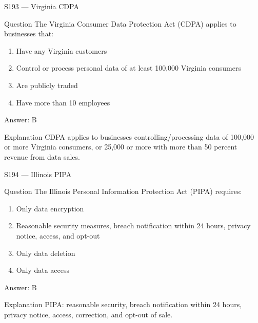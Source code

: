 \documentclass[aspectratio=169,8pt]{beamer}
\begin{document}
	\begin{frame}{S193 --- Virginia CDPA}
		\begin{block}{Question}
			The Virginia Consumer Data Protection Act (CDPA) applies to businesses that:
			\begin{enumerate}
				\item Have any Virginia customers
				\item Control or process personal data of at least 100,000 Virginia consumers
				\item Are publicly traded
				\item Have more than 10 employees
			\end{enumerate}
		\end{block}
		\begin{exampleblock}{Answer: B}\end{exampleblock}
		\begin{block}{Explanation}
			CDPA applies to businesses controlling/processing data of 100,000 or more Virginia consumers, or 25,000 or more with more than 50 percent revenue from data sales.
		\end{block}
	\end{frame}
	
	\begin{frame}{S194 --- Illinois PIPA}
		\begin{block}{Question}
			The Illinois Personal Information Protection Act (PIPA) requires:
			\begin{enumerate}
				\item Only data encryption
				\item Reasonable security measures, breach notification within 24 hours, privacy notice, access, and opt-out
				\item Only data deletion
				\item Only data access
			\end{enumerate}
		\end{block}
		\begin{exampleblock}{Answer: B}\end{exampleblock}
		\begin{block}{Explanation}
			PIPA: reasonable security, breach notification within 24 hours, privacy notice, access, correction, and opt-out of sale.
		\end{block}
	\end{frame}
	
\end{document}

